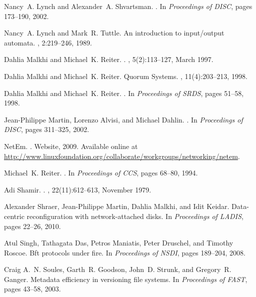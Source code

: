 \documentclass[10pt,conference,compsocconf]{IEEEtran}
\begin{document}
\begin{thebibliography}{10}
Nancy~A. Lynch and Alexander~A. Shvartsman.
.
\newblock In {\em Proceedings of DISC}, pages 173--190, 2002.

Nancy~A. Lynch and Mark~R. Tuttle.
\newblock An introduction to input/output automata.
, 2:219--246, 1989.

Dahlia Malkhi and Michael~K. Reiter.
.
, 5(2):113--127, March 1997.

Dahlia Malkhi and Michael~K. Reiter.
 {Q}uorum {S}ystems.
, 11(4):203--213, 1998.

Dahlia Malkhi and Michael~K. Reiter.
.
\newblock In {\em Proceedings of SRDS}, pages 51--58, 1998.

Jean-Philippe Martin, Lorenzo Alvisi, and Michael Dahlin.
.
\newblock In {\em Proceedings of DISC}, pages 311--325, 2002.

NetEm.
.
\newblock Website, 2009.
\newblock Available online at
  \url{http://www.linuxfoundation.org/collaborate/workgroups/networking/netem}.

Michael~K. Reiter.
.
\newblock In {\em Proceedings of CCS}, pages 68--80, 1994.

Adi Shamir.
.
, 22(11):612--613, November 1979.

Alexander Shraer, Jean-Philippe Martin, Dahlia Malkhi, and Idit Keidar.
\newblock Data-centric reconfiguration with network-attached disks.
\newblock In {\em Proceedings of LADIS}, pages 22--26, 2010.

Atul Singh, Tathagata Das, Petros Maniatis, Peter Druschel, and Timothy Roscoe.
\newblock Bft protocols under fire.
\newblock In {\em Proceedings of NSDI}, pages 189--204, 2008.

Craig A.~N. Soules, Garth~R. Goodson, John~D. Strunk, and Gregory~R. Ganger.
\newblock Metadata efficiency in versioning file systems.
\newblock In {\em Proceedings of FAST}, pages 43--58, 2003.


\end{thebibliography}
\end{document}

